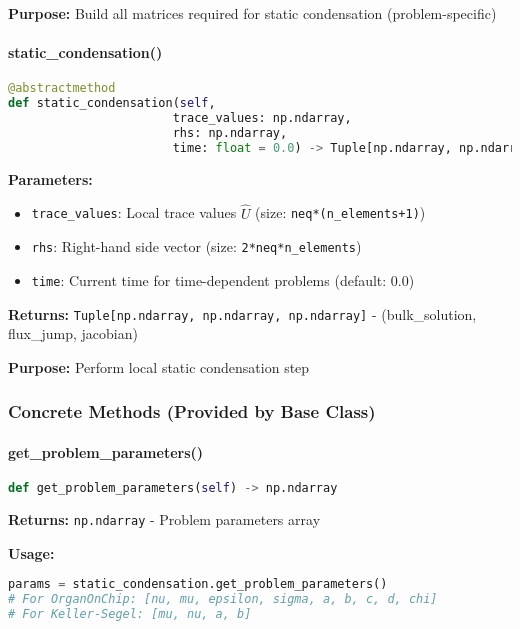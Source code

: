 \textbf{Purpose:} Build all matrices required for static condensation (problem-specific)

\paragraph{static\_condensation()}\leavevmode
\begin{lstlisting}[language=Python, caption=Abstract Static Condensation Method]
@abstractmethod
def static_condensation(self, 
                       trace_values: np.ndarray, 
                       rhs: np.ndarray, 
                       time: float = 0.0) -> Tuple[np.ndarray, np.ndarray, np.ndarray]
\end{lstlisting}

\textbf{Parameters:}
\begin{itemize}
    \item \texttt{trace\_values}: Local trace values $\hat{U}$ (size: \texttt{neq*(n\_elements+1)})
    \item \texttt{rhs}: Right-hand side vector (size: \texttt{2*neq*n\_elements})
    \item \texttt{time}: Current time for time-dependent problems (default: 0.0)
\end{itemize}

\textbf{Returns:} \texttt{Tuple[np.ndarray, np.ndarray, np.ndarray]} - (bulk\_solution, flux\_jump, jacobian)

\textbf{Purpose:} Perform local static condensation step

\subsubsection{Concrete Methods (Provided by Base Class)}

\paragraph{get\_problem\_parameters()}\leavevmode
\begin{lstlisting}[language=Python, caption=Get Problem Parameters Method]
def get_problem_parameters(self) -> np.ndarray
\end{lstlisting}

\textbf{Returns:} \texttt{np.ndarray} - Problem parameters array

\textbf{Usage:}
\begin{lstlisting}[language=Python, caption=Get Parameters Usage]
params = static_condensation.get_problem_parameters()
# For OrganOnChip: [nu, mu, epsilon, sigma, a, b, c, d, chi]
# For Keller-Segel: [mu, nu, a, b]
\end{lstlisting}

